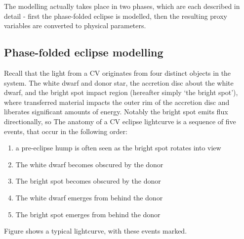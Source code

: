 The modelling actually takes place in two phases, which are each described in detail - first the phase-folded eclipse is modelled, then the resulting proxy variables are converted to physical parameters. 

\subsection{Phase-folded eclipse modelling}
\label{sect:modelling:eclipse modelling}

Recall that the light from a CV originates from four distinct objects in the system. The white dwarf and donor star, the accretion disc about the white dwarf, and the bright spot impact region (hereafter simply `the bright spot'), where transferred material impacts the outer rim of the accretion disc and liberates significant amounts of energy. Notably the bright spot emits flux directionally, so 
The anatomy of a CV eclipse lightcurve is a sequence of five events, that occur in the following order:
\begin{enumerate}
    \item a pre-eclipse hump is often seen as the bright spot rotates into view
    \item The white dwarf becomes obscured by the donor
    \item The bright spot becomes obscured by the donor
    \item The white dwarf emerges from behind the donor
    \item The bright spot emerges from behind the donor
\end{enumerate}
Figure shows a typical lightcurve, with these events marked. 

